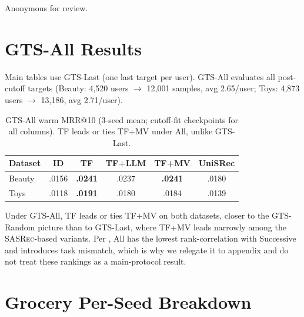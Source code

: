 \documentclass[sigconf,natbib=true,anonymous]{acmart}
\newcommand{\tfmv}{\textsc{TF+MV}\xspace}
\newcommand{\base}{\textsc{SASRec}\xspace}
\begin{document}
\begin{acks}
Anonymous for review.
\end{acks}

\appendix

\section{GTS-All Results}
\label{app:gts-all}

Main tables use GTS-Last (one last target per user).
GTS-All evaluates all post-cutoff targets (Beauty: 4{,}520 users $\to$ 12{,}001 samples, avg 2.65/user; Toys: 4{,}873 users $\to$ 13{,}186, avg 2.71/user).

\begin{table}[h]
\centering
\caption{GTS-All warm MRR@10 (3-seed mean; cutoff-fit checkpoints for all columns).
TF leads or ties \tfmv under All, unlike GTS-Last.}
\label{tab:gts-all}
\small
\begin{tabular}{@{}lccccc@{}}
\toprule
Dataset & ID & TF & TF+LLM & TF+MV & UniSRec \\
\midrule
Beauty & .0156 & \textbf{.0241} & .0237 & \textbf{.0241} & .0180 \\
Toys   & .0118 & \textbf{.0191} & .0180 & .0184 & .0139 \\
\bottomrule
\end{tabular}
\end{table}

Under GTS-All, TF leads or ties \tfmv on both datasets, closer to the GTS-Random picture than to GTS-Last, where \tfmv leads narrowly among the \base-based variants.
Per \citet{gusak2025time}, All has the lowest rank-correlation with Successive and introduces task mismatch, which is why we relegate it to appendix and do not treat these rankings as a main-protocol result.

\section{Grocery Per-Seed Breakdown}
\label{app:grocery}
\end{document}
